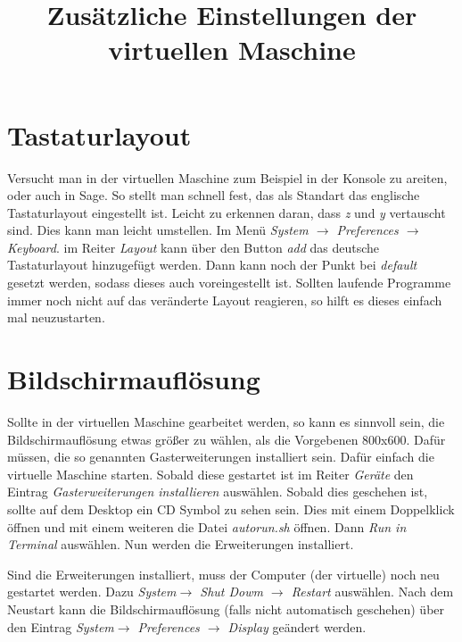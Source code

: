 \documentclass[a4paper,10pt]{article}
\title{Zusätzliche Einstellungen der virtuellen Maschine}
\begin{document}
\maketitle
\section{Tastaturlayout}
Versucht man in der virtuellen Maschine zum Beispiel in der Konsole zu areiten, oder auch in Sage. So stellt man schnell fest, 
das als Standart das englische Tastaturlayout eingestellt ist. Leicht zu erkennen daran, dass \emph{z} und \emph{y} vertauscht sind.
Dies kann man leicht umstellen. Im Menü \emph{System $\rightarrow$ Preferences $\rightarrow$ Keyboard}. im Reiter \emph{Layout} kann 
über den Button \emph{add} das deutsche Tastaturlayout hinzugefügt werden. Dann kann noch der Punkt bei \emph{default} gesetzt werden,
sodass dieses auch voreingestellt ist. Sollten laufende Programme immer noch nicht auf das veränderte Layout reagieren, so hilft es 
dieses einfach mal neuzustarten. 
\section{Bildschirmauflösung}
Sollte in der virtuellen Maschine gearbeitet werden, so kann es sinnvoll sein, die Bildschirmauflösung etwas größer zu wählen, als
die Vorgebenen 800x600. Dafür müssen, die so genannten Gasterweiterungen installiert sein. Dafür einfach die virtuelle Maschine
starten. Sobald diese gestartet ist im Reiter \emph{Geräte} den Eintrag \emph{Gasterweiterungen installieren} auswählen.
Sobald dies geschehen ist, sollte auf dem Desktop ein CD Symbol zu sehen sein. Dies mit einem Doppelklick öffnen und mit einem weiteren
die Datei \emph{autorun.sh} öffnen. Dann \emph{Run in Terminal} auswählen. Nun werden die Erweiterungen installiert.

Sind die Erweiterungen installiert, muss der Computer (der virtuelle) noch neu gestartet werden. Dazu 
\emph{System$\rightarrow$ Shut Dowm $\rightarrow$ Restart}
auswählen. Nach dem Neustart kann die Bildschirmauflösung (falls nicht automatisch geschehen) über den Eintrag 
\emph{System$\rightarrow$ Preferences $\rightarrow$ Display} geändert werden. 
\end{document}

